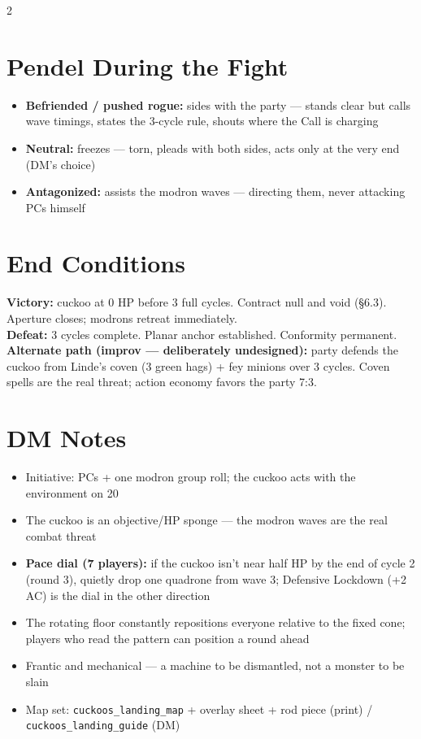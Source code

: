 \documentclass[10pt,letterpaper]{article}
\begin{document}
\begin{multicols}{2}
\section*{Pendel During the Fight}
\begin{itemize}
\item \textbf{Befriended / pushed rogue:} sides with the party --- stands clear but calls wave timings, states the 3-cycle rule, shouts where the Call is charging
\item \textbf{Neutral:} freezes --- torn, pleads with both sides, acts only at the very end (DM's choice)
\item \textbf{Antagonized:} assists the modron waves --- directing them, never attacking PCs himself
\end{itemize}

\section*{End Conditions}
\textbf{Victory:} cuckoo at 0 HP before 3 full cycles. Contract null and void (\S6.3). Aperture closes; modrons retreat immediately.\\
\textbf{Defeat:} 3 cycles complete. Planar anchor established. Conformity permanent.\\
\textbf{Alternate path (improv --- deliberately undesigned):} party defends the cuckoo from Linde's coven (3 green hags) + fey minions over 3 cycles. Coven spells are the real threat; action economy favors the party 7:3.

\section*{DM Notes}
\begin{itemize}
\item Initiative: PCs + one modron group roll; the cuckoo acts with the environment on 20
\item The cuckoo is an objective/HP sponge --- the modron waves are the real combat threat
\item \textbf{Pace dial (7 players):} if the cuckoo isn't near half HP by the end of cycle 2 (round 3), quietly drop one quadrone from wave 3; Defensive Lockdown (+2 AC) is the dial in the other direction
\item The rotating floor constantly repositions everyone relative to the fixed cone; players who read the pattern can position a round ahead
\item Frantic and mechanical --- a machine to be dismantled, not a monster to be slain
\item Map set: \texttt{cuckoos\_landing\_map} + overlay sheet + rod piece (print) / \texttt{cuckoos\_landing\_guide} (DM)
\end{itemize}

\end{multicols}
\end{document}
